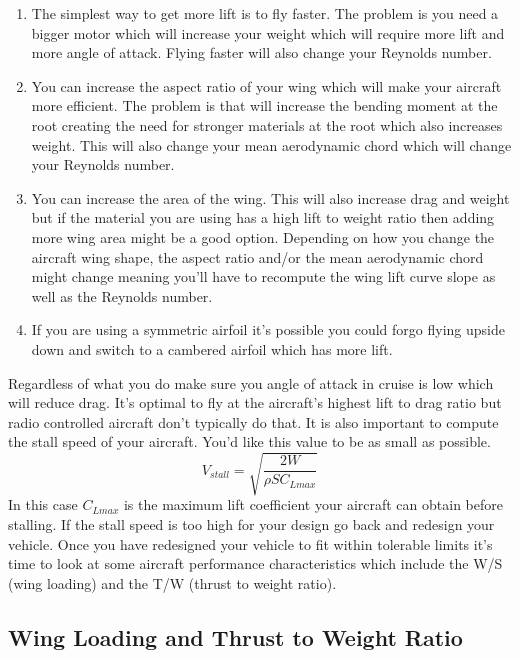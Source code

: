 \documentclass{article}
\begin{document}
\begin{enumerate}[itemsep=-5pt]
  \item The simplest way to get more lift is to fly faster. The
    problem is you need a bigger motor which will increase your weight
    which will require more lift and more angle of attack. Flying
    faster will also change your Reynolds number. 
  \item You can increase the aspect ratio of your wing which will make
    your aircraft more efficient. The problem is that will increase
    the bending moment at the root creating the need for stronger
    materials at the root which also increases weight. This will also
    change your mean aerodynamic chord which will change your Reynolds
    number. 
  \item You can increase the area of the wing. This will also increase
    drag and weight but if the material you are using has a high lift
    to weight ratio then adding more wing area might be a good
    option. Depending on how you change the aircraft wing shape, the
    aspect ratio and/or the mean aerodynamic chord might change
    meaning you'll have to recompute the wing lift curve slope as well
    as the Reynolds number. 
  \item If you are using a symmetric airfoil it's possible you could
    forgo flying upside down and switch to a cambered airfoil which
    has more lift.
\end{enumerate}

Regardless of what you do make sure you angle of attack in cruise is
low which will reduce drag. It's optimal to fly at the aircraft's
highest lift to drag ratio but radio controlled aircraft don't
typically do that. It is also important to compute the stall speed of
your aircraft. You'd like this value to be as small as possible.
\begin{equation}
V_{stall} = \sqrt{\frac{2W}{\rho S C_{Lmax}}}
\end{equation}
In this case $C_{Lmax}$ is the maximum lift coefficient your aircraft
can obtain before stalling. If the stall speed is too high for your
design go back and redesign your vehicle. Once you have redesigned
your vehicle to fit within tolerable limits it's time to look at some
aircraft performance characteristics which include the W/S (wing
loading) and the T/W (thrust to weight ratio). 

\subsection{Wing Loading and Thrust to Weight Ratio}
\end{document}
